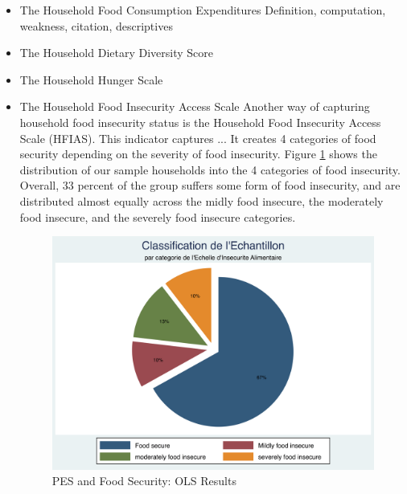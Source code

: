 \documentclass[preprint,12pt]{elsarticle}
\begin{document}
\begin{itemize}
	
	\item The Household Food Consumption Expenditures 
	Definition, computation, weakness, citation, descriptives

	\item The Household Dietary Diversity Score 

	\item The Household Hunger Scale	
	
	\item The Household Food Insecurity Access Scale  
	Another way of capturing household food insecurity status is the Household Food Insecurity Access Scale (HFIAS). This indicator captures ... It creates 4 categories of food security depending on the severity of food insecurity. Figure \ref{fig:HFIAS} shows the distribution of our sample households into the 4 categories of food insecurity. Overall, 33 percent of the group suffers some form of food insecurity, and are distributed almost equally across the midly food insecure, the moderately food insecure, and the severely food insecure categories. \\
	
	
	\begin{figure}[ht!]
		\footnotesize
		\centering
		\caption{PES and Food Security: OLS Results \label{fig:HFIAS}}
		\includegraphics[width=0.9\linewidth]{Food_Insecure_HFIApie.png}
	\end{figure}
	\FloatBarrier
	

		
\end{itemize}
\end{document}
